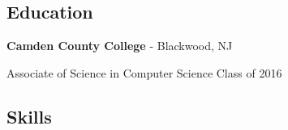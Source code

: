 \documentclass{article}
\begin{document}

	\vspace{0mm}

	\subsection*{Education}

	\vspace{2mm}

	\textbf{Camden County College} - Blackwood, NJ

	Associate of Science in Computer Science  
	Class of 2016



	\vspace{3mm}

	\subsection*{Skills}

	\vspace{2mm}

	\setlength{\columnsep}{-4.5in}
\end{document}
